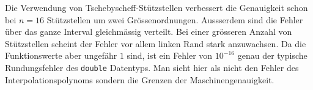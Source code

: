 Die Verwendung von Tschebyscheff-Stützstellen verbessert die Genauigkeit
schon bei $n=16$ Stützstellen um zwei Grössenordnungen.
Aussserdem sind die Fehler über das ganze Interval gleichmässig
verteilt.
Bei einer grösseren Anzahl von Stützstellen scheint der Fehler 
vor allem linken Rand stark anzuwachsen.
Da die Funktionswerte aber ungefähr $1$ sind, ist
ein Fehler von $10^{-16}$ genau der typische Rundungsfehler des
\texttt{double} Datentyps.
Man sieht hier als nicht den Fehler des Interpolationspolynoms sondern
die Grenzen der Maschinengenauigkeit.





